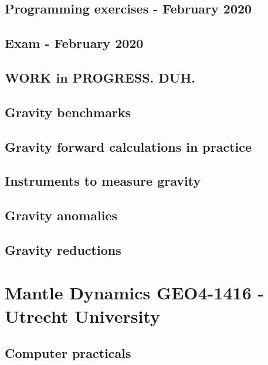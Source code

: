\documentclass[a4paper]{article}
\begin{document}
\subsection{Programming exercises - February 2020} 
\subsection{Exam - February 2020} 

\newpage
\subsection{WORK in PROGRESS. DUH.} %

\subsection{Gravity benchmarks} 
\subsection{Gravity forward calculations in practice} 
\subsection{Instruments to measure gravity} 
\subsection{Gravity anomalies} 
\subsection{Gravity reductions} 

\newpage
\section{Mantle Dynamics GEO4-1416 - Utrecht University}

\subsection{Computer practicals} 
\end{document}

